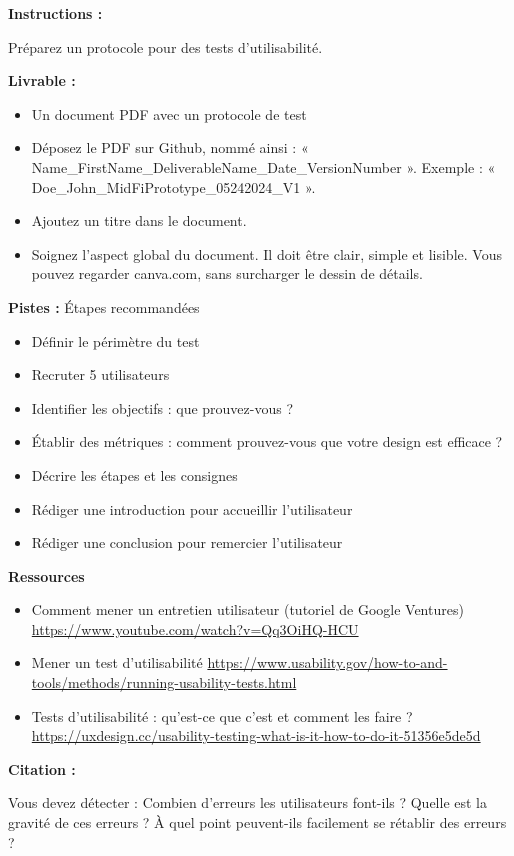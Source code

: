\makeheaderfiles

\textbf{Instructions :}

Préparez un protocole pour des tests d'utilisabilité.

\textbf{Livrable :}

\begin{itemize}
\item Un document PDF avec un protocole de test
\item Déposez le PDF sur Github, nommé ainsi : « Name\_FirstName\_DeliverableName\_Date\_VersionNumber ». Exemple : « Doe\_John\_MidFiPrototype\_05242024\_V1 ».
\item Ajoutez un titre dans le document.
\item Soignez l'aspect global du document. Il doit être clair, simple et lisible. Vous pouvez regarder canva.com, sans surcharger le dessin de détails.
\end{itemize}

\textbf{Pistes :} Étapes recommandées

\begin{itemize}
\item Définir le périmètre du test
\item Recruter 5 utilisateurs
\item Identifier les objectifs : que prouvez-vous ?
\item Établir des métriques : comment prouvez-vous que votre design est efficace ?
\item Décrire les étapes et les consignes
\item Rédiger une introduction pour accueillir l'utilisateur
\item Rédiger une conclusion pour remercier l'utilisateur
\end{itemize}

\textbf{Ressources}

\begin{itemize}
\item Comment mener un entretien utilisateur (tutoriel de Google Ventures) \url{https://www.youtube.com/watch?v=Qq3OiHQ-HCU}
\item Mener un test d'utilisabilité \url{https://www.usability.gov/how-to-and-tools/methods/running-usability-tests.html}
\item Tests d'utilisabilité : qu'est-ce que c'est et comment les faire ? \url{https://uxdesign.cc/usability-testing-what-is-it-how-to-do-it-51356e5de5d}
\end{itemize}

\textbf{Citation :}

Vous devez détecter : Combien d'erreurs les utilisateurs font-ils ? Quelle est la gravité de ces erreurs ? À quel point peuvent-ils facilement se rétablir des erreurs ?

